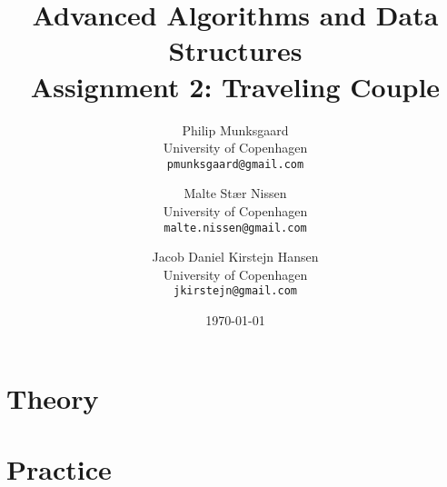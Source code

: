 \documentclass[11pt,a4paper,english]{article}
\title{Advanced Algorithms and Data Structures\\
       Assignment 2: Traveling Couple}
\author{
  Philip Munksgaard\\
    University of Copenhagen\\
    \texttt{pmunksgaard@gmail.com}
    \and
        Malte Stær Nissen\\
    University of Copenhagen\\
          \texttt{malte.nissen@gmail.com}
    \and
  Jacob Daniel Kirstejn Hansen\\
    University of Copenhagen\\
    \texttt{jkirstejn@gmail.com}
}
\date{\today}
\begin{document}
\maketitle

\tableofcontents
\clearpage

\section{Theory}




\section{Practice}


%
\end{document}
